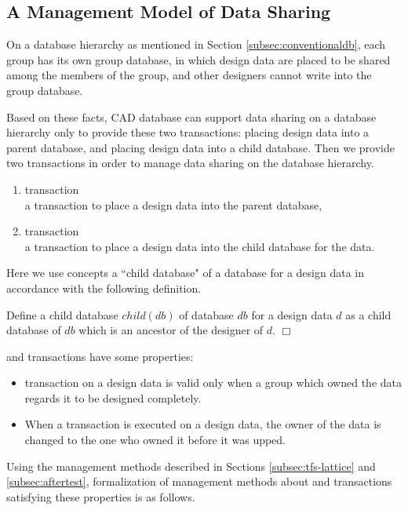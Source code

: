 \subsection{A Management Model of Data Sharing}
 \label{subsec:updown}
On a database hierarchy as mentioned in Section
\ref{subsec:conventionaldb}, each group has its own group database,
in which design data are placed to be shared among the members of the 
group, and other designers cannot write into the group database.

Based on these facts, CAD database can support data sharing on a
database hierarchy only to provide these two transactions: placing design
data into a parent database, and placing design data into a child
database.
Then we provide two transactions in order to manage
data sharing on the database hierarchy.
\begin{enumerate}
 \item \up transaction\\
a transaction to place a design data into the parent database,
 \item \down transaction\\
a transaction to place a design data into the child database for the
data.
\end{enumerate}

Here we use concepts a ``child database" of a database for a design
data in accordance with the following definition.
\begin{definition}\label{def:child-for-dd}
Define a child database $child(db)$ of database $db$ for a design 
data $d$ as a child database of $db$ which is an ancestor of the 
designer of $d$. \hfill$\Box$
\end{definition}

\up and \down transactions have some properties:
\begin{itemize}
\item \up transaction on a design data is valid only when a group which 
owned the data regards it to be designed completely.
\item When a \down transaction is executed on a design data, the owner
of the data is changed to the one who owned it before it was upped.
\end{itemize}

Using the management methods described in Sections
\ref{subsec:tfs-lattice} and \ref{subsec:aftertest}, formalization of 
management methods about \up and \down transactions 
satisfying these properties is as follows.

